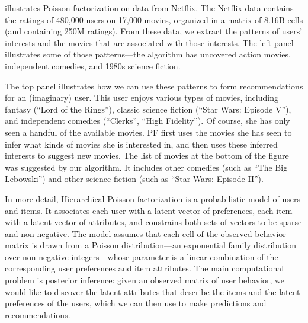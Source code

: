  illustrates Poisson factorization on data
from Netflix.  The Netflix data contains the ratings of 480,000 users
on 17,000 movies, organized in a matrix of 8.16B cells (and containing
250M ratings).  From these data, we extract the patterns of users'
interests and the movies that are associated with those interests.
The left panel illustrates some of those patterns---the algorithm has
uncovered action movies, independent comedies, and 1980s science
fiction.

The top panel illustrates how we can use these patterns to form
recommendations for an (imaginary) user.  This user enjoys various
types of movies, including fantasy (``Lord of the Rings''), classic
science fiction (``Star Wars: Episode V''), and independent comedies
(``Clerks'', ``High Fidelity'').  Of course, she has only seen a
handful of the available movies.  PF first uses the movies she has
seen to infer what kinds of movies she is interested in, and then uses
these inferred interests to suggest new movies.  The
list of movies at the bottom of the figure was suggested by our
algorithm. It includes other comedies (such as ``The Big Lebowski'') and
other science fiction (such as ``Star Wars: Episode II'').

In more detail, Hierarchical Poisson factorization is a probabilistic
model of users and items.  It associates each user with a latent
vector of preferences, each item with a latent vector of attributes,
and constrains both sets of vectors to be sparse and non-negative. The
model assumes that each cell of the observed behavior matrix is drawn
from a Poisson distribution---an exponential family distribution over
non-negative integers---whose parameter is a linear combination of the
corresponding user preferences and item attributes.  The main
computational problem is posterior inference: given an observed matrix
of user behavior, we would like to discover the latent attributes that
describe the items and the latent preferences of the users, which we
can then use to make predictions and recommendations.



